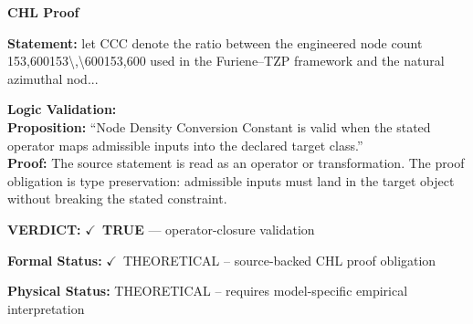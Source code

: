 \vspace{0.45em}
\noindent\textbf{CHL Proof}\par
\textbf{Statement:} let CCC denote the ratio between the engineered node count 153,600153\textbackslash{},\textbackslash{}600153,600 used
in the Furiene--TZP framework and the natural azimuthal nod...

\textbf{Logic Validation:}\\
\textbf{Proposition:} ``Node Density Conversion Constant is valid when the stated operator maps admissible
inputs into the declared target class.''\\
\textbf{Proof:} The source statement is read as an operator or transformation. The proof obligation is
type preservation: admissible inputs must land in the target object without breaking the
stated constraint.

\textbf{VERDICT:} \ensuremath{\checkmark}\ \textbf{TRUE} --- operator-closure validation

\textbf{Formal Status:} \ensuremath{\checkmark}\ THEORETICAL -- source-backed CHL proof obligation

\textbf{Physical Status:} THEORETICAL -- requires model-specific empirical interpretation
\par\vspace{0.45em}
\par
\ifTZPDarkEdition
{}
\fi
\endgroup
\endgroup

